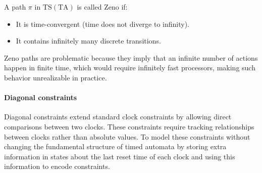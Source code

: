 \begin{definition}
    A path $\pi$ in $\text{TS}(\text{TA})$ is called Zeno if:
    \begin{itemize}
        \item It is time-convergent (time does not diverge to infinity).
        \item It contains infinitely many discrete transitions.
    \end{itemize}
\end{definition}
\noindent Zeno paths are problematic because they imply that an infinite number of actions happen in finite time, which would require infinitely fast processors, making such behavior unrealizable in practice.

\paragraph*{Diagonal constraints}
Diagonal constraints extend standard clock constraints by allowing direct comparisons between two clocks. 
These constraints require tracking relationships between clocks rather than absolute values.
To model these constraints without changing the fundamental structure of timed automata by storing extra information in states about the last reset time of each clock and using this information to encode constraints. 